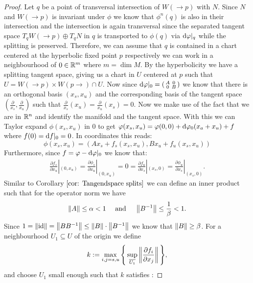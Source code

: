 \begin{proof}
    Let $q$ be a point of transversal intersection of $W(\to p)$ with $N$. Since $N$ and $W(\to p)$ is invariant under $\phi$ we know that $\phi^n(q)$ is also in their intersection and the intersection is again transversal since the separated tangent space $T_q W(\to p) \oplus T_qN$ in $q$ is transported to $\phi(q)$ via $\mathop{}\!\mathrm{d} \varphi|_q $ while the splitting is preserved. Therefore, we can assume that $q$ is contained in a chart centered at the hyperbolic fixed point $p$ respectively we can work in a neighbourhood of $0\in \mathbb{R}^m$ where $m=\dim M$. By the hyperbolicity we have a splitting tangent space, giving us a chart in $U$ centered at $p$ such that $U=W(\to p) \times W(p\to)\cap U$. Now since $\mathop{}\!\mathrm{d} \varphi|_0=\left(\begin{smallmatrix}
        A & 0\\
        0&B
    \end{smallmatrix}\right)$ we know that there is an orthogonal basis $(x_s,x_u)$ and the corresponding basis of the tangent space $(\frac{\partial}{x_s},\frac{\partial}{x_u})$ such that $\frac{\partial}{x_s}(x_u)=\frac{\partial}{x_u}(x_s)=0$. Now we make use of the fact that we are in $\mathbb{R}^n$ and identify the manifold and the tangent space.  With this we can Taylor expand $\phi(x_s,x_u)$ in $0$ to get $\varphi(x_s,x_u)=\varphi(0,0)+\mathop{}\!\mathrm{d} \varphi_0(x_a+x_u)+f$ where $f(0)=\mathop{}\!\mathrm{d} f|_0=0$. In coordinates this reads:
    \begin{equation} \label{eq: proof of Lambda lemma phi split}
    \phi(x_s,x_u)=(Ax_s+f_s(x_s,x_u),Bx_u+f_u(x_s,x_u))
\end{equation}     Furthermore, since $f=\varphi-\mathop{}\!\mathrm{d} \varphi|_0$ we know that: 
    \begin{align*}
        \frac{\partial f_s}{\partial x_u}|_{(0,x_u)}=\frac{\partial \phi_s}{\partial x_u}|_{(0,x_u)}=0=\frac{\partial f_u}{\partial x_s}|_{(x_s,0)}=\frac{\partial \phi_u}{\partial x_s}|_{(x_s,0)}.
    \end{align*} Similar to Corollary $\ref{cor: Tangendspace splits}$ we can define an inner product such that for the operator norm we have 
    \begin{align*}
        \left\lVert A\right\rVert\leq \alpha <1 \quad \text{ and } \quad \left\lVert B^{-1}\right\rVert\leq \frac{1}{\beta} <1.
    \end{align*}
    Since $1=\left\lVert\operatorname{\mathrm{id}}\right\rVert=\left\lVert BB^{-1}\right\rVert\leq \left\lVert B\right\rVert\cdot \left\lVert B^{-1}\right\rVert$ we know that $\left\lVert B\right\rVert\geq \beta$.
For a neighbourhood $U_1\subseteq U$ of the origin we define 
\begin{align*}
    k:=\max_{i,j=s,u} \Bigg\{ \sup_{\overline{U_1}}\left\lVert\frac{\partial f_i}{\partial x_j}\right\rVert \Bigg\},
\end{align*} and choose $U_1$ small enough such that $k$ satisfies :



\end{proof}
